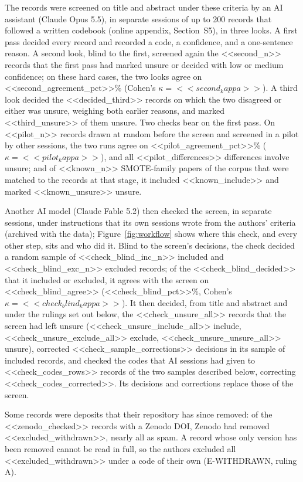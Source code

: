 The records were screened on title and abstract under these criteria by an AI assistant (Claude Opus 5.5), in separate sessions of up to 200 records that followed a written codebook (online appendix, Section~S5), in three looks. A first pass decided every record and recorded a code, a confidence, and a one-sentence reason. A second look, blind to the first, screened again the <<second_n>> records that the first pass had marked unsure or decided with low or medium confidence; on these hard cases, the two looks agree on <<second_agreement_pct>>\% (Cohen's $\kappa = <<second_kappa>>$). A third look decided the <<decided_third>> records on which the two disagreed or either was unsure, weighing both earlier reasons, and marked <<third_unsure>> of them unsure. Two checks bear on the first pass. On <<pilot_n>> records drawn at random before the screen and screened in a pilot by other sessions, the two runs agree on <<pilot_agreement_pct>>\% ($\kappa = <<pilot_kappa>>$), and all <<pilot_differences>> differences involve unsure; and of <<known_n>> SMOTE-family papers of the corpus that were matched to the records at that stage, it included <<known_include>> and marked <<known_unsure>> unsure.

Another AI model (Claude Fable 5.2) then checked the screen, in separate sessions, under instructions that its own sessions wrote from the authors' criteria (archived with the data); Figure~\ref{fig:workflow} shows where this check, and every other step, sits and who did it. Blind to the screen's decisions, the check decided a random sample of <<check_blind_inc_n>> included and <<check_blind_exc_n>> excluded records; of the <<check_blind_decided>> that it included or excluded, it agrees with the screen on <<check_blind_agree>> (<<check_blind_pct>>\%, Cohen's $\kappa = <<check_blind_kappa>>$). It then decided, from title and abstract and under the rulings set out below, the <<check_unsure_all>> records that the screen had left unsure (<<check_unsure_include_all>> include, <<check_unsure_exclude_all>> exclude, <<check_unsure_unsure_all>> unsure), corrected <<check_sample_corrections>> decisions in its sample of included records, and checked the codes that AI sessions had given to <<check_codes_rows>> records of the two samples described below, correcting <<check_codes_corrected>>. Its decisions and corrections replace those of the screen.

Some records were deposits that their repository has since removed: of the <<zenodo_checked>> records with a Zenodo DOI, Zenodo had removed <<excluded_withdrawn>>, nearly all as spam. A record whose only version has been removed cannot be read in full, so the authors excluded all <<excluded_withdrawn>> under a code of their own (E-WITHDRAWN, ruling A).

